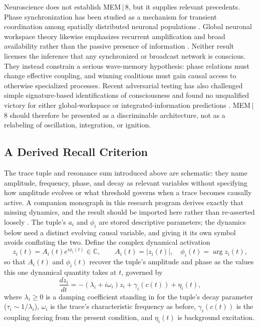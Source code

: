 \documentclass[11pt]{article}
\begin{document}
Neuroscience does not establish MEM\,$|$\,8, but it supplies relevant precedents. Phase synchronization has been studied as a mechanism for transient coordination among spatially distributed neuronal populations \cite{varela2001,palva2005}. Global neuronal workspace theory likewise emphasizes recurrent amplification and broad availability rather than the passive presence of information \cite{dehaene2011,mashour2020}. Neither result licenses the inference that any synchronized or broadcast network is conscious. They instead constrain a serious wave-memory hypothesis: phase relations must change effective coupling, and winning coalitions must gain causal access to otherwise specialized processes. Recent adversarial testing has also challenged simple signature-based identifications of consciousness and found no unqualified victory for either global-workspace or integrated-information predictions \cite{ferrante2025}. MEM\,$|$\,8 should therefore be presented as a discriminable architecture, not as a relabeling of oscillation, integration, or ignition.

\subsection{A Derived Recall Criterion}
\label{sec:recall-criterion}

The trace tuple and resonance sum introduced above are schematic: they name amplitude, frequency, phase, and decay as relevant variables without specifying how amplitude evolves or what threshold governs when a trace becomes causally active. A companion monograph in this research program derives exactly that missing dynamics, and the result should be imported here rather than re-asserted loosely \cite{flyxionMem8Monograph}. The tuple's $a_i$ and $\phi_i$ are stored descriptive parameters; the dynamics below need a distinct evolving causal variable, and giving it its own symbol avoids conflating the two. Define the complex dynamical activation
\[
z_i(t) = A_i(t)e^{i\phi_i(t)} \in \mathbb{C}, \qquad A_i(t)=|z_i(t)|,\quad \phi_i(t)=\arg z_i(t),
\]
so that $A_i(t)$ and $\phi_i(t)$ recover the tuple's amplitude and phase as the values this one dynamical quantity takes at $t$, governed by
\[
\frac{dz_i}{dt} = -(\lambda_i+i\omega_i)z_i + \gamma_i(c(t)) + \eta_i(t),
\]
where $\lambda_i\geq 0$ is a damping coefficient standing in for the tuple's decay parameter ($\tau_i\sim 1/\lambda_i$), $\omega_i$ is the trace's characteristic frequency as before, $\gamma_i(c(t))$ is the coupling forcing from the present condition, and $\eta_i(t)$ is background excitation.
\end{document}
